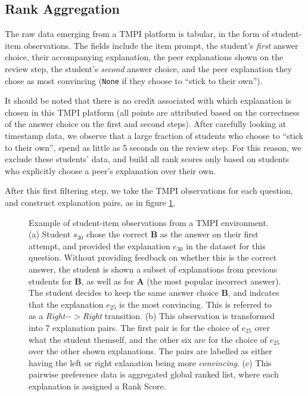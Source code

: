 \documentclass[acmsmall]{acmart}
\begin{document}
\subsection{Rank Aggregation}
The raw data emerging from a TMPI platform is tabular, in the form of 
student-item observations.
The fields include the item prompt, the student's \textit{first} answer choice, 
their accompanying explanation, the peer explanations shown on the review step, 
the student's \textit{second} answer choice, and the peer explanation they 
chose as most convincing (\verb|None| if they choose to ``stick to their own'').

It should be noted that there is no credit associated with which explanation is 
chosen in this TMPI platform (all points are attributed based on the 
correctness of the answer choice on the first and second steps).
After carefully looking at timestamp data, we observe that a large fraction of 
students who choose to ``stick to their own'', spend as little as 5 seconds on 
the review step.
For this reason, we exclude these students' data, and build all rank scores 
only based on students who explicitly choose a peer's explanation over their 
own.

After this first filtering step, we take the TMPI observations for each 
question, and construct explanation pairs, as in figure 
\ref{fig:make_pairs_a}.


\begin{figure}
	\caption{
	Example of student-item observations from a TMPI environment. 
	(a) Student $s_{30}$ chose the correct \textbf{B} as the answer on 
	their first attempt, and provided the explanation $e_{30}$ in the dataset 
	for this question. 
	Without providing feedback on whether this is the correct answer, the 
	student is shown a subset of explanations from previous students for 
	\textbf{B}, as well as for \textbf{A} (the most popular incorrect answer). 
	The student decides to keep the same answer choice \textbf{B}, and 
	indcates that the explanation $e_25$ is the most convincing.
	This is referred to as a \textit{Right}$->$\textit{Right} transition.
	(b) This observation is transformed into 7 explanation pairs. The first 
	pair is for the choice of $e_{25}$ over what the student themself, 
	and the other six are for the choice of $e_{25}$ over the other shown 
	explanations. 
	The pairs are labelled as either having the left or right exlanation being 
	more \textit{convincing}.
	(c) This pairwise preference data is aggregated global ranked list, where 
	each explanation is assigned a Rank Score. 
	}
	\label{fig:make_pairs_a}
\end{figure}
\end{document}
